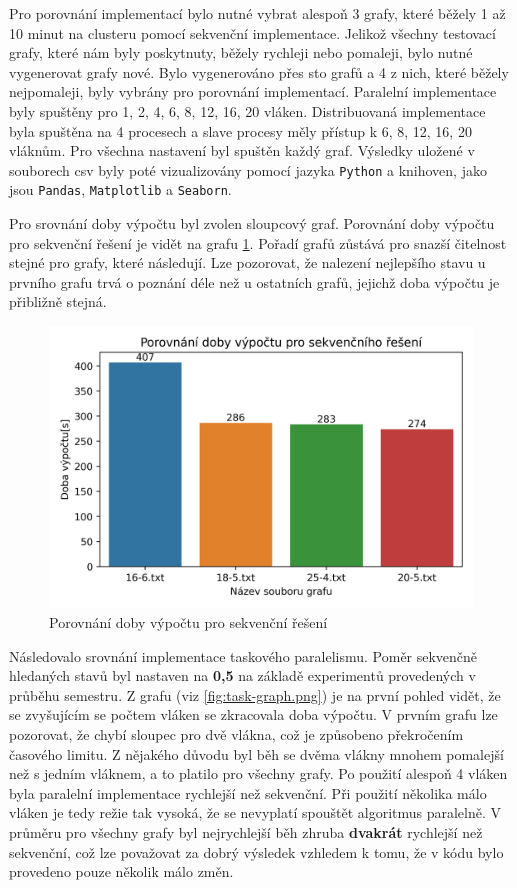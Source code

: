 Pro porovnání implementací bylo nutné vybrat alespoň 3 grafy, které běžely 1 až 10 minut na clusteru pomocí sekvenční implementace.
Jelikož všechny testovací grafy, které nám byly poskytnuty, běžely rychleji nebo pomaleji, bylo nutné vygenerovat grafy nové.
Bylo vygenerováno přes sto grafů a 4 z nich, které běžely nejpomaleji, byly vybrány pro porovnání implementací.
Paralelní implementace byly spuštěny pro 1, 2, 4, 6, 8, 12, 16, 20 vláken.
Distribuovaná implementace byla spuštěna na 4 procesech a slave procesy měly přístup k 6, 8, 12, 16, 20 vláknům.
Pro všechna nastavení byl spuštěn každý graf.
Výsledky uložené v souborech csv byly poté vizualizovány pomocí jazyka \texttt{Python} a knihoven, jako jsou \texttt{Pandas}, \texttt{Matplotlib} a \texttt{Seaborn}.

Pro srovnání doby výpočtu byl zvolen sloupcový graf.
Porovnání doby výpočtu pro sekvenční řešení je vidět na grafu \ref{fig:seq-graph.png}.
Pořadí grafů zůstává pro snazší čitelnost stejné pro grafy, které následují.
Lze pozorovat, že nalezení nejlepšího stavu u prvního grafu trvá o poznání déle než u ostatních grafů, jejichž doba výpočtu je přibližně stejná.

\begin{figure}[!htbp]
\centerline{\includegraphics[scale=0.56]{report/images/seq-graph.png}}
\caption{Porovnání doby výpočtu pro sekvenční řešení}
\label{fig:seq-graph.png}
\end{figure}
\FloatBarrier

Následovalo srovnání implementace taskového paralelismu.
Poměr sekvenčně hledaných stavů byl nastaven na \textbf{0,5} na základě experimentů provedených v průběhu semestru.
Z grafu (viz \ref{fig:task-graph.png}) je na první pohled vidět, že se zvyšujícím se počtem vláken se zkracovala doba výpočtu.
V prvním grafu lze pozorovat, že chybí sloupec pro dvě vlákna, což je způsobeno překročením časového limitu.
Z nějakého důvodu byl běh se dvěma vlákny mnohem pomalejší než s jedním vláknem, a to platilo pro všechny grafy.
Po použití alespoň 4 vláken byla paralelní implementace rychlejší než sekvenční.
Při použití několika málo vláken je tedy režie tak vysoká, že se nevyplatí spouštět algoritmus paralelně.
V průměru pro všechny grafy byl nejrychlejší běh zhruba \textbf{dvakrát} rychlejší než sekvenční, což lze považovat za dobrý výsledek vzhledem k tomu, že v kódu bylo provedeno pouze několik málo změn.

